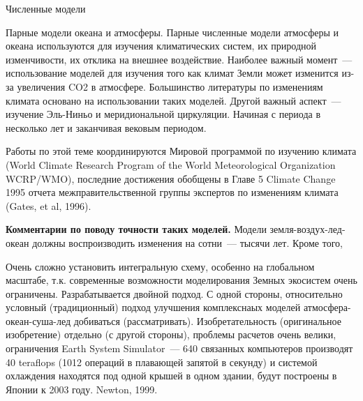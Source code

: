 \begin{chapter}{Численные модели}
\begin{section}{Парные модели океана и атмосферы.}
Парные численные модели атмосферы и океана используются для изучения
климатических систем, их природной изменчивости, их отклика на внешнее
воздействие. Наиболее важный момент~--- использование моделей для
изучения того как климат Земли может изменится из-за увеличения CO2 в
атмосфере. Большинство литературы по изменениям климата основано на
использовании таких моделей. Другой важный аспект~--- изучение
Эль-Ниньо и меридиональной циркуляции. Начиная с периода в несколько
лет и заканчивая вековым периодом.
%

Работы по этой теме координируются Мировой программой по изучению
климата (World Climate Research Program of the World Meteorological
Organization WCRP/WMO), последние достижения обобщены в Главе 5
Climate Change 1995 отчета межправительственной группы экспертов по
изменениям климата (Gates, et al, 1996).
%

\textbf{Комментарии по поводу точности таких моделей.} Модели
земля-воздух-лед-океан должны воспроизводить изменения на сотни~---
тысячи лет. Кроме того,

Очень сложно установить интегральную схему, особенно на глобальном
масштабе, т.к. современные возможности моделирования Земных экосистем
очень ограничены. Разрабатывается двойной подход. С одной стороны,
относительно условный (традиционный) подход улучшения комплекснаых
моделей атмосфера-океан-суша-лед добиваться
(рассматривать). Изобретательность (оригинальное изобретение) отдельно
(с другой стороны), проблемы расчетов очень велики, ограничения Earth
System Simulator~--- 640 связанных компьютеров производят 40
teraflops (1012 операций в плавающей запятой в секунду) и системой
охлаждения находятся под одной крышей в одном здании, будут построены
в Японии к 2003 году. Newton, 1999.


\end{section}
\end{chapter}
